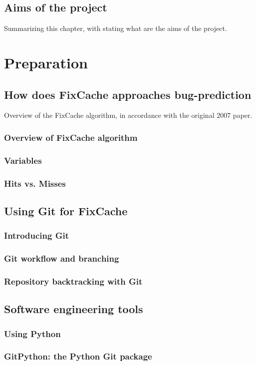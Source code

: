 \documentclass[12pt,twoside,notitlepage]{report}
\begin{document}
\section{Aims of the project}
Summarizing this chapter, with stating what are the aims of the project.
\cleardoublepage
\chapter{Preparation}
\section{How does FixCache approaches bug-prediction}
Overview of the FixCache algorithm, in accordance with the original 2007 paper.
\subsection{Overview of FixCache algorithm}
\subsection{Variables}
\subsection{Hits vs. Misses}
\section{Using Git for FixCache}
\subsection{Introducing Git}
\subsection{Git workflow and branching}
\subsection{Repository backtracking with Git}
\section{Software engineering tools}
\subsection{Using Python}
\subsection{GitPython: the Python Git package}
\end{document}
